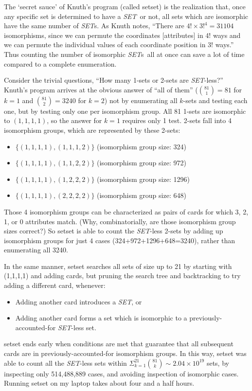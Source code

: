 \documentclass{article}
\newcommand{\SET}{{\em SET}}
\newcommand{\SETs}{{\em SET}s}
\newcommand{\SETSET}{{\sc setset}}
\newcommand{\SETSETb}{{\sc setset }}
\begin{document}
The `secret sauce' of Knuth's program (called \SETSET) is the realization that,
once any specific set is determined to have a \SET~or not, all sets which are
isomorphic have the same number of \SETs. As Knuth notes, ``There are $4! \times
3!^4 = 31104$ isomorphisms, since we can permute the coordinates [attributes] in
4! ways and we can permute the individual values of each coordinate position in
3! ways.''  Thus counting the number of isomorphic \SETs~all at once can save a
lot of time compared to a complete enumeration.

Consider the trivial questions, ``How many 1-sets or 2-sets are \SET-less?''
Knuth's program arrives at the obvious answer of ``all of them''
($\binom{81}{1}=81$ for $k=1$ and $\binom{81}{2}=3240$ for $k=2$) not by
enumerating all $k$-sets and testing each one, but by testing only one per
isomorphism group. All 81 1-sets are isomorphic to ${(1,1,1,1)}$, so the answer
for $k=1$ requires only 1 test. 2-sets fall into 4 isomorphism groups, which are
represented by these 2-sets:
\begin{itemize}
\item $\{(1,1,1,1), (1,1,1,2)\}$ (isomorphism group size: 324)
\item $\{(1,1,1,1), (1,1,2,2)\}$ (isomorphism group size: 972)
\item $\{(1,1,1,1), (1,2,2,2)\}$ (isomorphism group size: 1296)
\item $\{(1,1,1,1), (2,2,2,2)\}$ (isomorphism group size: 648)
\end{itemize}
Those 4 isomorphism groups can be characterized as pairs of cards for which 3,
2, 1, or 0 attributes match. (Why, combinatorially, are those isomorphism group
sizes correct?) So \SETSETb is able to count the \SET-less 2-sets by adding up
isomorphism groups for just 4 cases (324+972+1296+648=3240), rather than
enumerating all 3240.

In the same manner, \SETSETb searches all sets of size up to 21 by starting with
(1,1,1,1) and adding cards, but pruning the search tree and backtracking to try
adding a different card, whenever:
\begin{itemize}
\item Adding another card introduces a \SET, or
\item Adding another card forms a set which is isomorphic to a
  previously-accounted-for \SET-less set.
\end{itemize}
\SETSETb ends early when conditions are met that guarantee that all
subsequent cards are in previously-accounted-for isomorphism groups. In this
way, \SETSETb was able to count all the \SET-less sets within
$\Sigma_{k=1}^{21}\binom{81}{k}\sim 2.04\times 10^{19}$ sets, by inspecting only
514,488,889 cases, and avoiding inspection of isomorphic cases. Running \SETSETb
on my laptop takes about four and a half hours.
\end{document}
